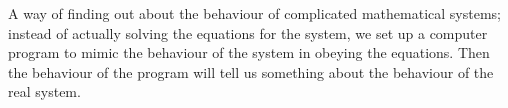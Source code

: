 A way of finding out about the behaviour of complicated mathematical
systems; instead of actually solving the equations for the system,
we set up a computer program to mimic the behaviour of the system
in obeying the equations. Then the behaviour of the program will
tell us something about the behaviour of the real system.